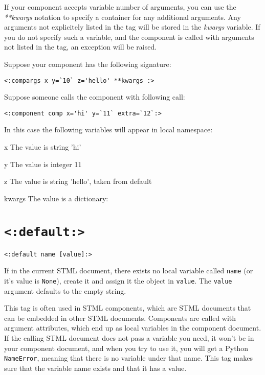 \documentclass{manual}
\begin{document}
If your component accepts variable number of arguments, you can
use the \emph{**kwargs} notation to specify a container for any 
additional arguments. Any arguments not explicitely listed in the 
 tag will be stored in the 
\emph{kwargs} variable. 
If you do not specify such a variable, and the component is called
with arguments not listed in the  tag, 
an exception will be raised.

Suppose your component has the following signature:

\begin{verbatim}
<:compargs x y=`10` z='hello' **kwargs :>
\end{verbatim}


Suppose someone calls the component with following call: 

\begin{verbatim}
<:component comp x='hi' y=`11` extra=`12`:>
\end{verbatim}


In this case the following variables will appear in local namespace:
\begin{argdesc}
\item[x] The value is string 'hi'
\item[y] The value is integer 11
\item[z] The value is string 'hello', taken from default 
\item[kwargs] The value is a dictionary: 
\end{argdesc}

 

\section{\texttt{<:default:>}}
\label{tagdefault}

\begin{verbatim}
<:default name [value]:>
\end{verbatim}

If in the current STML document, there exists no local variable called
\texttt{name} (or it's value is \texttt{None}), create it and assign
it the object in \texttt{value}. The \texttt{value} argument defaults
to the empty string.

This tag is often used in STML components, which are STML
documents that can be embedded in other STML documents. Components
are called with argument attributes, which end up as local
variables in the component document. If the calling STML document
does not pass a variable you need, it won't be in your component
document, and when you try to use it, you will get a Python
\texttt{NameError}, meaning that there is no variable under that
name. This tag makes sure that the variable name exists and that
it has a value.
\end{document}
